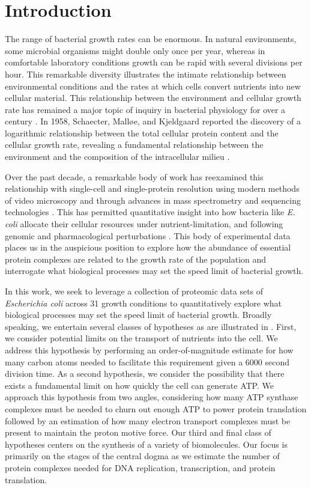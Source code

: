 

\section{Introduction}
The range of bacterial growth rates can be enormous. In natural environments,
some microbial organisms might double only once per year, whereas in comfortable
laboratory conditions growth can be rapid with several divisions per hour. This
remarkable diversity illustrates the intimate relationship between environmental
conditions and the rates at which cells convert nutrients into new cellular
material. This relationship between the environment and cellular growth rate has
remained a major topic of inquiry in bacterial physiology for over a century
\citep{jun2018}. In 1958, Schaecter, Mall\o e, and Kjeldgaard reported the
discovery of a logarithmic relationship between the total cellular protein
content and the cellular growth rate, revealing a fundamental relationship
between the environment and the composition of the intracellular milieu
\citep{schaechter1958}.

Over the past decade, a remarkable body of work has reexamined this relationship
with single-cell and single-protein resolution using modern methods of video
microscopy \citep{si2017,harris2018} and through advances in mass spectrometry and
sequencing technologies \citep{schmidt2016,li2014}. This has permitted
quantitative insight into how bacteria like \textit{E. coli} allocate their
cellular resources under nutrient-limitation, and following genomic and
pharmacological perturbations \citep{scott2010,hui2015,basan2015}.
This body of experimental data places us in the auspicious position to
explore how the abundance of essential protein complexes are related to the
growth rate of the population and interrogate what biological processes may set
the speed limit of bacterial growth.

In this work, we seek to leverage a collection of proteomic data sets of
\textit{Escherichia coli} across 31 growth conditions \citep{valgepea2013,li2014,
peebo2015,hui2015,schmidt2016} to quantitatively explore what biological
processes may set the speed limit of bacterial growth. Broadly speaking, we
entertain several classes of hypotheses as are illustrated in .
First, we consider potential limits on the transport of nutrients into the cell.
We address this hypothesis by performing an order-of-magnitude estimate for how
many carbon atoms needed to facilitate this requirement given a 6000 second
division time.  As a second hypothesis, we consider the possibility that there
exists a fundamental limit on how quickly the cell can generate ATP. We approach
this hypothesis from two angles, considering how many ATP synthase complexes
must be needed to churn out enough ATP to power protein translation followed by
an estimation of how many electron transport complexes must be present to
maintain the proton motive force. Our third and final class of hypotheses
centers on the synthesis of a variety of biomolecules. Our focus is primarily on
the stages of the central dogma as we estimate the number of protein complexes
needed for DNA replication, transcription, and protein translation.

